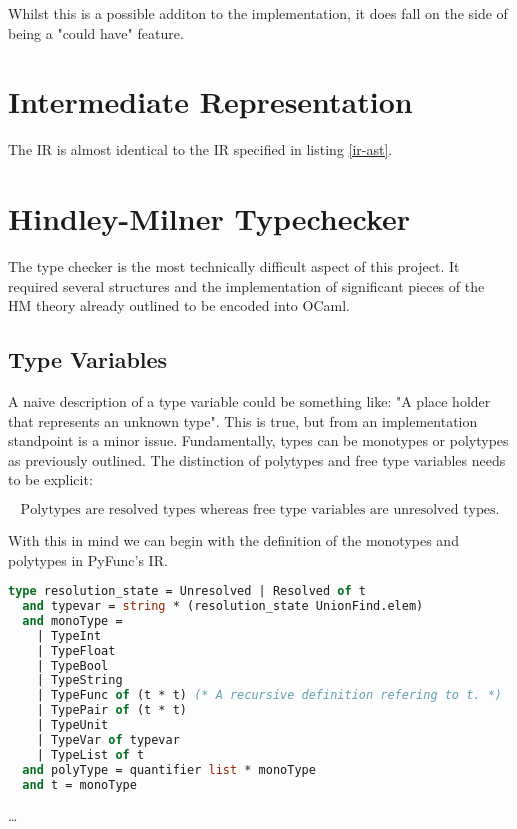 \documentclass{l4proj}
\begin{document}
Whilst this is a possible additon to the implementation, it does fall on the side of being a "could have" feature.

\section{Intermediate Representation}

The IR is almost identical to the IR specified in listing \ref{ir-ast}.

\section{Hindley-Milner Typechecker} \label{sec:hindley-milner-typechecker}

The type checker is the most technically difficult aspect of this project.
It required several structures and the implementation of significant pieces of the HM theory already outlined to be encoded into OCaml.

\subsection{Type Variables}

A naive description of a type variable could be something like: "A place holder that represents an unknown type".
This is true, but from an implementation standpoint is a minor issue.
Fundamentally, types can be monotypes or polytypes as previously outlined.
The distinction of polytypes and free type variables needs to be explicit:

\[\text{Polytypes are resolved types whereas free type variables are unresolved types.}\]

With this in mind we can begin with the definition of the monotypes and polytypes in PyFunc's IR.

\begin{lstlisting}[language=Caml, caption="Pyfunc internal definitions for types.]
  type resolution_state = Unresolved | Resolved of t
  and typevar = string * (resolution_state UnionFind.elem)
  and monoType = 
    | TypeInt
    | TypeFloat
    | TypeBool
    | TypeString
    | TypeFunc of (t * t) (* A recursive definition refering to t. *)
    | TypePair of (t * t)
    | TypeUnit
    | TypeVar of typevar
    | TypeList of t
  and polyType = quantifier list * monoType
  and t = monoType
\end{lstlisting}

\dots
\end{document}

